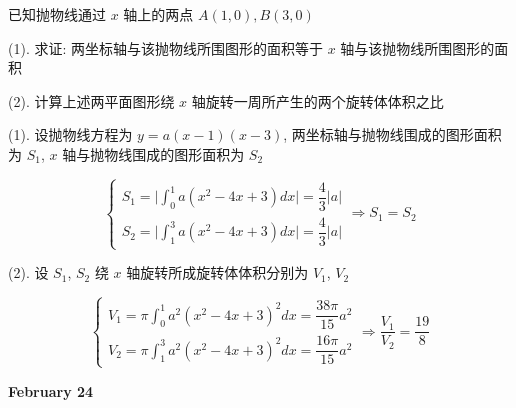\begin{example}[][Exam: 28.4.4]
	已知抛物线通过 $x$ 轴上的两点 $A(1,0),B(3,0)$

(1). 求证: 两坐标轴与该抛物线所围图形的面积等于 $x$ 轴与该抛物线所围图形的面积

(2). 计算上述两平面图形绕 $x$ 轴旋转一周所产生的两个旋转体体积之比
\end{example}
\begin{solution}

(1). 设抛物线方程为 $y=a(x-1)(x-3)$, 两坐标轴与抛物线围成的图形面积为 $S_{1}$, $x$ 轴与抛物线围成的图形面积为 $S_{2}$

$$\begin{cases}
  S_{1}= \big|\int_{0}^{1}a(x^{2}-4x+3)dx\big| = \dfrac{4}{3}|a|\\
  S_{2} = \big|\int_{1}^{3}a(x^{2}-4x+3)dx\big| = \dfrac{4}{3}|a|
\end{cases}\Rightarrow S_{1} = S_{2}$$

(2). 设 $S_{1}$, $S_{2}$ 绕 $x$ 轴旋转所成旋转体体积分别为 $V_{1}$, $V_{2}$

$$\begin{cases}
  V_{1} = \pi\int_{0}^{1}a^{2}(x^{2}-4x+3)^{2}dx = \dfrac{38\pi}{15}a^{2}\\
  V_{2} = \pi\int_{1}^{3}a^{2}(x^{2}-4x+3)^{2}dx = \dfrac{16\pi}{15}a^{2}
\end{cases}\Rightarrow \dfrac{V_{1}}{V_{2}} = \dfrac{19}{8}$$
\end{solution}

\textcolor{purplea}{\textbf{February 24}}

